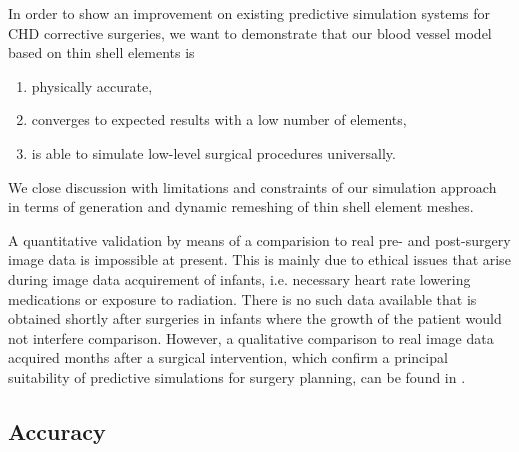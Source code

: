 In order to show an improvement on existing predictive simulation systems for CHD corrective surgeries, we want to demonstrate that our blood vessel model based on thin shell elements is
\begin{enumerate}
\item physically accurate, 
\item converges to expected results with a low number of elements,
\item is able to simulate low-level surgical procedures universally.
\end{enumerate}
We close discussion with limitations and constraints of our simulation approach in terms of generation and dynamic remeshing of thin shell element meshes.

A quantitative validation by means of a comparision to real pre- and post-surgery image data is impossible at present. This is mainly due to ethical issues that arise during image data acquirement of infants, i.e. necessary heart rate lowering medications or exposure to radiation. There is no such data available that is obtained shortly after surgeries in infants where the growth of the patient would not interfere comparison. However, a qualitative comparison to real image data acquired months after a surgical intervention, which confirm a principal suitability of predictive simulations for surgery planning, can be found in \cite{Li2009}.

\subsection{Accuracy}

